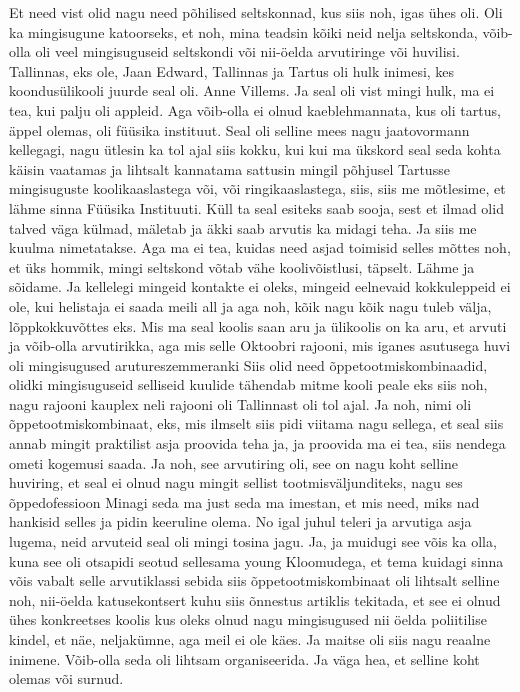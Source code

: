 Et need vist olid nagu need põhilised seltskonnad, kus siis noh, igas ühes oli.
Oli ka mingisugune katoorseks, et noh, mina teadsin kõiki neid nelja seltskonda, võib-olla oli veel mingisuguseid seltskondi või nii-öelda arvutiringe või huvilisi. Tallinnas, eks ole, Jaan Edward, Tallinnas ja Tartus oli hulk inimesi, kes koondusülikooli juurde seal oli. Anne Villems. Ja seal oli vist mingi hulk, ma ei tea, kui palju oli appleid. Aga võib-olla ei olnud kaeblehmannata, kus oli tartus, äppel olemas, oli füüsika instituut. Seal oli selline mees nagu jaatovormann kellegagi, nagu ütlesin ka tol ajal siis kokku, kui kui ma ükskord seal seda kohta käisin vaatamas ja lihtsalt kannatama sattusin mingil põhjusel Tartusse mingisuguste koolikaaslastega või, või ringikaaslastega, siis, siis me mõtlesime, et lähme sinna Füüsika Instituuti. Küll ta seal esiteks saab sooja, sest et ilmad olid talved väga külmad, mäletab ja äkki saab arvutis ka midagi teha. Ja siis me kuulma nimetatakse. Aga ma ei tea, kuidas need asjad toimisid selles mõttes noh, et üks hommik, mingi seltskond võtab vähe koolivõistlusi, täpselt. Lähme ja sõidame. Ja kellelegi mingeid kontakte ei oleks, mingeid eelnevaid kokkuleppeid ei ole, kui helistaja ei saada meili all ja aga noh, kõik nagu kõik nagu tuleb välja, lõppkokkuvõttes eks.
Mis ma seal koolis saan aru ja ülikoolis on ka aru, et arvuti ja võib-olla arvutirikka, aga mis selle Oktoobri rajooni, mis iganes asutusega huvi oli mingisugused arutureszemmeranki
Siis olid need õppetootmiskombinaadid, olidki mingisuguseid selliseid kuulide tähendab mitme kooli peale eks siis noh, nagu rajooni kauplex neli rajooni oli Tallinnast oli tol ajal. Ja noh, nimi oli õppetootmiskombinaat, eks, mis ilmselt siis pidi viitama nagu sellega, et seal siis annab mingit praktilist asja proovida teha ja, ja proovida ma ei tea, siis nendega ometi kogemusi saada. Ja noh, see arvutiring oli, see on nagu koht selline huviring, et seal ei olnud nagu mingit sellist tootmisväljunditeks, nagu ses õppedofessioon
Minagi seda ma just seda ma imestan, et mis need, miks nad hankisid selles ja pidin keeruline olema.
No igal juhul teleri ja arvutiga asja lugema, neid arvuteid seal oli mingi tosina jagu. Ja, ja muidugi see võis ka olla, kuna see oli otsapidi seotud sellesama young Kloomudega, et tema kuidagi sinna võis vabalt selle arvutiklassi sebida siis õppetootmiskombinaat oli lihtsalt selline noh, nii-öelda katusekontsert kuhu siis õnnestus artiklis tekitada, et see ei olnud ühes konkreetses koolis kus oleks olnud nagu mingisugused nii öelda poliitilise kindel, et näe, neljakümne, aga meil ei ole käes. Ja maitse oli siis nagu reaalne inimene. Võib-olla seda oli lihtsam organiseerida. Ja väga hea, et selline koht olemas või surnud.

